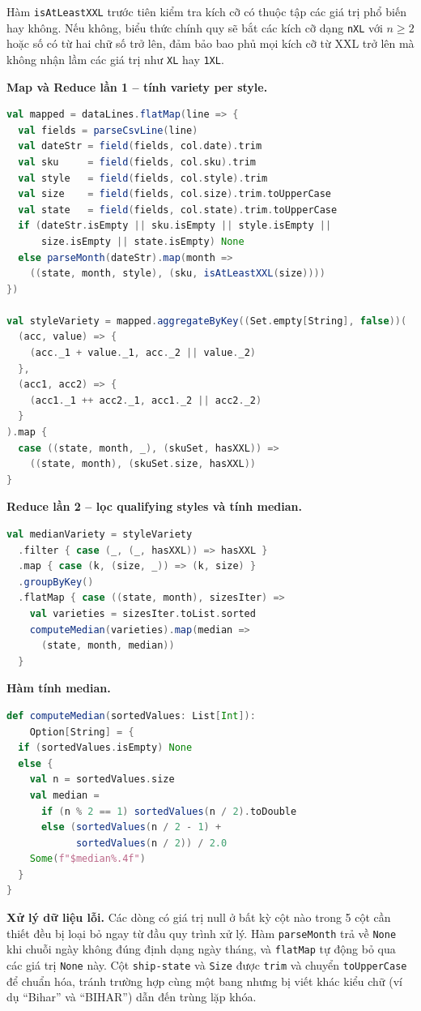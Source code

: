Hàm \texttt{isAtLeastXXL} trước tiên kiểm tra kích cỡ có thuộc tập các giá trị phổ biến hay không. Nếu không, biểu thức chính quy sẽ bắt các kích cỡ dạng \texttt{nXL} với $n \geq 2$ hoặc số có từ hai chữ số trở lên, đảm bảo bao phủ mọi kích cỡ từ XXL trở lên mà không nhận lầm các giá trị như \texttt{XL} hay \texttt{1XL}.

\textbf{Map và Reduce lần 1 -- tính variety per style.}
\begin{lstlisting}[language=Scala]
val mapped = dataLines.flatMap(line => {
  val fields = parseCsvLine(line)
  val dateStr = field(fields, col.date).trim
  val sku     = field(fields, col.sku).trim
  val style   = field(fields, col.style).trim
  val size    = field(fields, col.size).trim.toUpperCase
  val state   = field(fields, col.state).trim.toUpperCase
  if (dateStr.isEmpty || sku.isEmpty || style.isEmpty ||
      size.isEmpty || state.isEmpty) None
  else parseMonth(dateStr).map(month =>
    ((state, month, style), (sku, isAtLeastXXL(size))))
})

val styleVariety = mapped.aggregateByKey((Set.empty[String], false))(
  (acc, value) => {
    (acc._1 + value._1, acc._2 || value._2)
  },
  (acc1, acc2) => {
    (acc1._1 ++ acc2._1, acc1._2 || acc2._2)
  }
).map {
  case ((state, month, _), (skuSet, hasXXL)) =>
    ((state, month), (skuSet.size, hasXXL))
}
\end{lstlisting}

\textbf{Reduce lần 2 -- lọc qualifying styles và tính median.}
\begin{lstlisting}[language=Scala]
val medianVariety = styleVariety
  .filter { case (_, (_, hasXXL)) => hasXXL }
  .map { case (k, (size, _)) => (k, size) }
  .groupByKey()
  .flatMap { case ((state, month), sizesIter) =>
    val varieties = sizesIter.toList.sorted
    computeMedian(varieties).map(median =>
      (state, month, median))
  }
\end{lstlisting}

\textbf{Hàm tính median.}
\begin{lstlisting}[language=Scala]
def computeMedian(sortedValues: List[Int]):
    Option[String] = {
  if (sortedValues.isEmpty) None
  else {
    val n = sortedValues.size
    val median =
      if (n % 2 == 1) sortedValues(n / 2).toDouble
      else (sortedValues(n / 2 - 1) +
            sortedValues(n / 2)) / 2.0
    Some(f"$median%.4f")
  }
}
\end{lstlisting}

\textbf{Xử lý dữ liệu lỗi.} Các dòng có giá trị null ở bất kỳ cột nào trong 5 cột cần thiết đều bị loại bỏ ngay từ đầu quy trình xử lý. Hàm \texttt{parseMonth} trả về \texttt{None} khi chuỗi ngày không đúng định dạng ngày tháng, và \texttt{flatMap} tự động bỏ qua các giá trị \texttt{None} này. Cột \texttt{ship-state} và \texttt{Size} được \texttt{trim} và chuyển \texttt{toUpperCase} để chuẩn hóa, tránh trường hợp cùng một bang nhưng bị viết khác kiểu chữ (ví dụ ``Bihar'' và ``BIHAR'') dẫn đến trùng lặp khóa.

